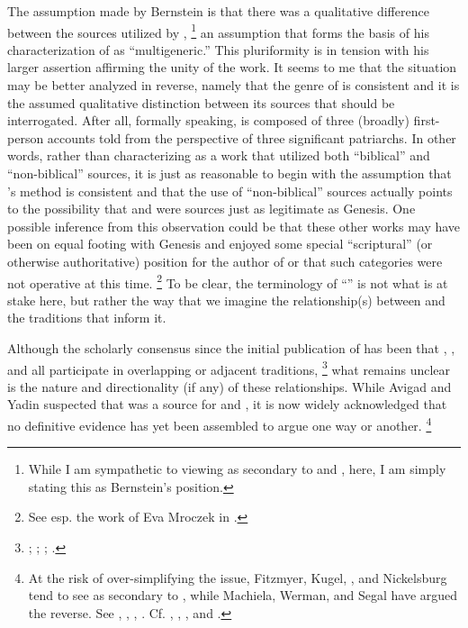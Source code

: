 The assumption made by Bernstein is that there was a qualitative difference between the sources utilized by \ga,%
    \footnote{While I am sympathetic to viewing \ga as secondary to \jub and \firstenoch, here, I am simply stating this as Bernstein's position.}
an assumption that forms the basis of his characterization of \ga as ``multigeneric.'' This pluriformity is in tension with his larger assertion affirming the unity of the work. It seems to me that the situation may be better analyzed in reverse, namely that the genre of \ga is consistent and it is the assumed qualitative distinction between its sources that should be interrogated. After all, formally speaking, \ga is composed of three (broadly) first-person accounts told from the perspective of three significant patriarchs. In other words, rather than characterizing \ga as a work that utilized both ``biblical'' and ``non-biblical'' sources, it is just as reasonable to begin with the assumption that \ga's method is consistent and that the use of ``non-biblical'' sources actually points to the possibility that \jub and \firstenoch were sources just as legitimate as Genesis. One possible inference from this observation could be that these other works may have been on equal footing with Genesis and enjoyed some special ``scriptural'' (or otherwise authoritative) position for the author of \ga or that such categories were not operative at this time.%
    \footnote{See esp. the work of Eva Mroczek in \cite*[114--155]{mroczek2016}.} To be clear, the terminology of ``\rwb'' is not what is at stake here, but rather the way that we imagine the relationship(s) between \ga and the traditions that inform it.

Although the scholarly consensus since the initial publication of \ga has been that \firstenoch, \jub, and \ga all participate in overlapping or adjacent traditions,%
    \footnote{\Cite[38]{avigad-yadin1956}; \cite[20--22]{fitzmyer2004}; \cite[110--116]{crawford2008}; \cite[8--19]{machiela2009}.}
what remains unclear is the nature and directionality (if any) of these relationships. While Avigad and Yadin suspected that \ga was a source for \firstenoch and \jub,%
    \autocite[38]{avigad-yadin1956}
it is now widely acknowledged that no definitive evidence has yet been assembled to argue one way or another.%
    \footnote{At the risk of over-simplifying the issue, Fitzmyer, Kugel, \vanderkam, and Nickelsburg tend to see \ga as secondary to \jub, while Machiela, Werman, and Segal have argued the reverse. See \cite{vanderkam_feldman-etal2017}, \cite[20--22]{fitzmyer2004}, \cite[174]{nickelsburg2005}, \cite[305--342]{kugel2012}. Cf. \cite{segal_as2010}, \cite[140--142]{machiela2009}, \cite{machiela_mason-etal2012}, and \cite[171--177]{werman_chazon-etal1999}.}


